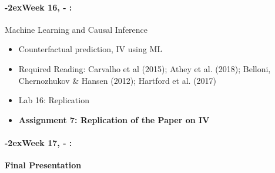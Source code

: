 \documentclass[11pt]{article}
\newcommand{\week}[1]{%
  \paragraph*{\kern-2ex\quad #1, \syldate{\today} - \AdvanceDate[4]\syldate{\today}:}%
  \ifdim\wd1=\wd\MONDAY
    \AdvanceDate[7]
  \else
    \AdvanceDate[7]
  \fi%
}
\begin{document}
\week{Week 16} Machine Learning and Causal Inference
\begin{itemize}
\item Counterfactual prediction, IV using ML
\item Required Reading:  Carvalho et al (2015); Athey et al. (2018); Belloni, Chernozhukov {\&} Hansen (2012); Hartford et al. (2017)
\item Lab 16: Replication

\item \textbf{Assignment 7: Replication of the Paper on IV}
\end{itemize}

\week{Week 17} \textbf{Final Presentation}
\end{document}
